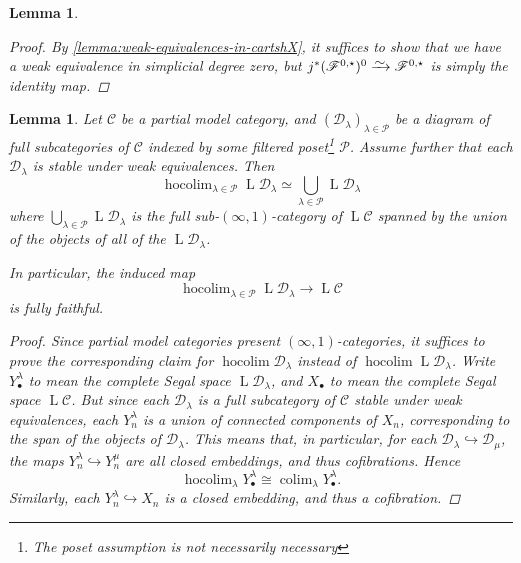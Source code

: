 \documentclass[11pt,fleqn]{article}
\theoremstyle{plain}
\newtheorem{lemma}[theorem]{Lemma}
\theoremstyle{definition}
\theoremstyle{remark}
\numberwithin{equation}{theorem}
\newcommand{\anotherbullet}{\star}
\newcommand{\congto}{\xrightarrow{\raisebox{-.5ex}[0ex][0ex]{$\sim$}}}
\DeclareMathOperator{\LL}{L}
\DeclareMathOperator{\colim}{colim}
\DeclareMathOperator{\hocolim}{hocolim}
\begin{document}
\begin{lemma}
\begin{proof}
                By \cref{lemma:weak-equivalences-in-cartshX}, it suffices to show that we have a weak equivalence in simplicial degree zero, but $j^*(\mathscr{F}^{0,\anotherbullet})^0\congto\mathscr{F}^{0,\anotherbullet}$ is simply the identity map.
            \end{proof}
        \end{lemma}

        \begin{lemma}\label{lemma:filtered-poset-colimit}
            Let $\mathcal{C}$ be a partial model category, and $(\mathcal{D}_\lambda)_{\lambda\in\mathcal{P}}$ be a diagram of full subcategories of $\mathcal{C}$ indexed by some filtered poset\footnote{The poset assumption is not necessarily necessary} $\mathcal{P}$.
            Assume further that each $\mathcal{D}_\lambda$ is stable under weak equivalences.
            Then
            \[
                \hocolim_{\lambda\in\mathcal{P}} \LL{\mathcal{D}_\lambda}
                \simeq
                \bigcup_{\lambda\in\mathcal{P}} \LL{\mathcal{D}_\lambda}
            \]
            where $\bigcup_{\lambda\in\mathcal{P}} \LL{\mathcal{D}_\lambda}$ is the full sub-$(\infty,1)$-category of $\LL{\mathcal{C}}$ spanned by the union of the objects of all of the $\LL{\mathcal{D}_\lambda}$.

            In particular, the induced map
            \[
                \hocolim_{\lambda\in\mathcal{P}} \LL{\mathcal{D}_\lambda}
                \to
                \LL{\mathcal{C}}
            \]
            is fully faithful.

            \begin{proof}
                Since partial model categories present $(\infty,1)$-categories, it suffices to prove the corresponding claim for $\hocolim\mathcal{D}_\lambda$ instead of $\hocolim\LL{\mathcal{D}_\lambda}$.
                Write $Y_\bullet^\lambda$ to mean the complete Segal space $\LL{\mathcal{D}_\lambda}$, and $X_\bullet$ to mean the complete Segal space $\LL{\mathcal{C}}$.
                But since each $\mathcal{D}_\lambda$ is a full subcategory of $\mathcal{C}$ stable under weak equivalences, each $Y_n^\lambda$ is a union of connected components of $X_n$, corresponding to the span of the objects of $\mathcal{D}_\lambda$.
                This means that, in particular, for each $\mathcal{D}_\lambda\hookrightarrow\mathcal{D}_\mu$, the maps $Y_n^\lambda\hookrightarrow Y_n^\mu$ are all closed embeddings, and thus cofibrations.
                Hence
                \[
                    \hocolim_\lambda Y_\bullet^\lambda \cong \colim_\lambda Y_\bullet^\lambda.
                \]
                Similarly, each $Y_n^\lambda\hookrightarrow X_n$ is a closed embedding, and thus a cofibration.


\end{proof}
\end{lemma}
\end{document}
